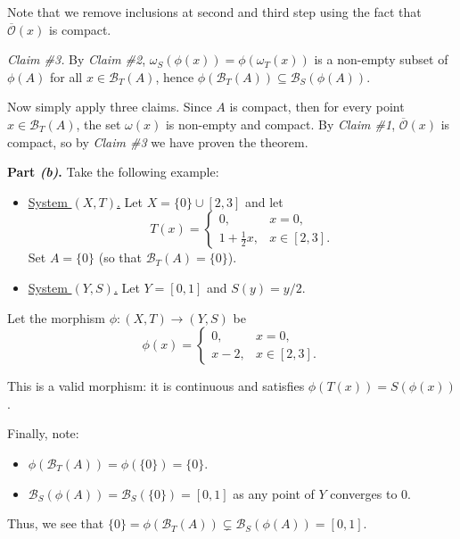 \documentclass{template}
\begin{document}
Note that we remove inclusions at second and third step using the fact that
$\overline{\mathcal{O}}(x)$ is compact.

\textit{Claim \#3.} By \textit{Claim \#2}, $\omega_S(\phi(x)) =
\phi(\omega_T(x))$ is a non-empty subset of $\phi(A)$ for all $x \in
\mathcal{B}_T(A)$, hence $\phi(\mathcal{B}_T(A)) \subseteq
\mathcal{B}_S(\phi(A))$.

Now simply apply three claims. Since $A$ is compact, then for every point $x \in
\mathcal{B}_T(A)$, the set $\omega(x)$ is non-empty and compact. By
\textit{Claim \#1}, $\overline{\mathcal{O}}(x)$ is compact, so by \textit{Claim
\#3} we have proven the theorem.

\textcolor{blue!70!black}{\textbf{Part \textit{(b)}.}} Take the following
example:

\begin{itemize}
    \item \underline{System $(X,T)$.} Let $X = \{0\} \cup [2,3]$ and let
    \begin{equation*}
        T(x) = \begin{cases}
            0, & x = 0, \\
            1+\frac{1}{2}x, & x \in [2,3].
        \end{cases}
    \end{equation*}
    Set $A=\{0\}$ (so that $\mathcal{B}_T(A)=\{0\}$).
    \item \underline{System $(Y,S)$.} Let $Y=[0,1]$ and $S(y) = y/2$.
\end{itemize}

Let the morphism $\phi: (X,T) \to (Y,S)$ be 
\begin{equation*}
    \phi(x) = \begin{cases}
        0, & x=0, \\
        x-2, & x \in [2,3].
    \end{cases}
\end{equation*}

This is a valid morphism: it is continuous and satisfies $\phi(T(x)) =
S(\phi(x))$.

Finally, note:
\begin{itemize}
    \item $\phi(\mathcal{B}_T(A)) = \phi(\{0\}) = \{0\}$.
    \item $\mathcal{B}_S(\phi(A)) = \mathcal{B}_S(\{0\}) = [0,1]$ as any point
    of $Y$ converges to $0$.
\end{itemize}

Thus, we see that $\{0\}=\phi(\mathcal{B}_T(A)) \subsetneq \mathcal{B}_S(\phi(A)) = [0,1]$.



\end{document}
